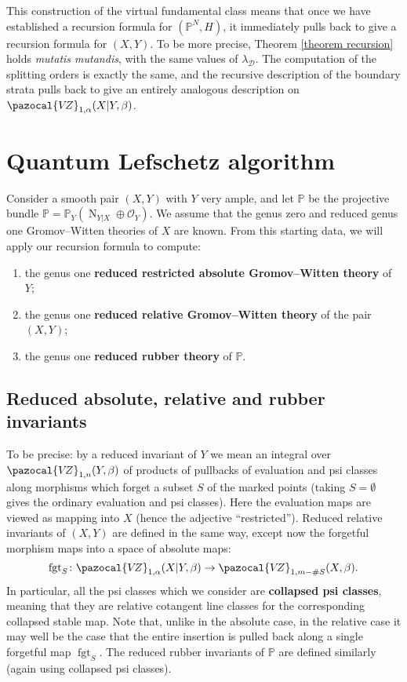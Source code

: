 \documentclass[11pt]{amsart}
\newcommand{\PP}{\mathbb P}
\newcommand{\VZ}{\pazocal{V\!Z}}
\newcommand{\OO}{\mathcal{O}}
\renewcommand{\to}{\rightarrow}
\newcommand{\fgt}{\operatorname{fgt}}
\newcommand{\Dcal}{\mathcal{D}}
\theoremstyle{definition}
\theoremstyle{definition}
\begin{document}
This construction of the virtual fundamental class means that once we have established a recursion formula for $(\PP^N,H)$, it immediately pulls back to give a recursion formula for $(X,Y)$. To be more precise, Theorem \ref{theorem recursion} holds \emph{mutatis mutandis}, with the same values of $\lambda_\Dcal$. The computation of the splitting orders is exactly the same, and the recursive description of the boundary strata pulls back to give an entirely analogous description on $\VZ_{1,\alpha}(X|Y,\beta)$.


\section{Quantum Lefschetz algorithm}\label{section recursion algorithm}
Consider a smooth pair $(X,Y)$ with $Y$ very ample, and let $\mathbb{P}$ be the projective bundle $\mathbb{P}=\PP_Y(\operatorname{N}_{Y|X} \oplus\OO_Y)$. We assume that the genus zero and reduced genus one Gromov--Witten theories of $X$ are known. From this starting data, we will apply our recursion formula to compute:
\begin{enumerate}
\item the genus one \textbf{reduced restricted absolute Gromov--Witten theory} of $Y$;
\item the genus one \textbf{reduced relative Gromov--Witten theory} of the pair $(X,Y)$;
\item the genus one \textbf{reduced rubber theory} of $\mathbb{P}$.
\end{enumerate}

\subsection{Reduced absolute, relative and rubber invariants} To be precise: by a reduced invariant of $Y$ we mean an integral over $\VZ_{1,n}(Y,\beta)$ of products of pullbacks of evaluation and psi classes along morphisms which forget a subset $S$ of the marked points (taking $S=\emptyset$ gives the ordinary evaluation and psi classes). Here the evaluation maps are viewed as mapping into $X$ (hence the adjective ``restricted''). Reduced relative invariants of $(X,Y)$ are defined in the same way, except now the forgetful morphism maps into a space of absolute maps:
\begin{equation*} \fgt_S \colon \VZ_{1,\alpha}(X|Y,\beta) \to \VZ_{1,m-\#S}(X,\beta).\end{equation*}
In particular, all the psi classes which we consider are \textbf{collapsed psi classes}, meaning that they are relative cotangent line classes for the corresponding collapsed stable map. Note that, unlike in the absolute case, in the relative case it may well be the case that the entire insertion is pulled back along a single forgetful map $\fgt_S$. The reduced rubber invariants of $\mathbb{P}$ are defined similarly (again using collapsed psi classes).
\end{document}
